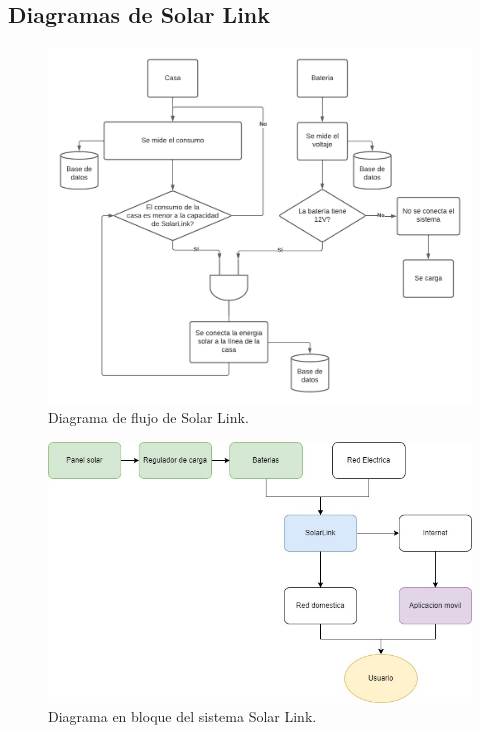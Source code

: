 \subsection{Diagramas de Solar Link}

\begin{figure}[H]
    \centering
    \includegraphics[width=1\linewidth]{analisis-tecnico/Diagrama de flujo SolarLink.png}
    \caption{Diagrama de flujo de Solar Link.}
    \label{fig:enter-label}
\end{figure}

\begin{figure}[H]
    \centering
    \includegraphics[width=1\linewidth]{analisis-tecnico/Diagrama SolarLink.jpg}
    \caption{Diagrama en bloque del sistema Solar Link.}
    \label{fig:flujo-solarlink}
\end{figure}

